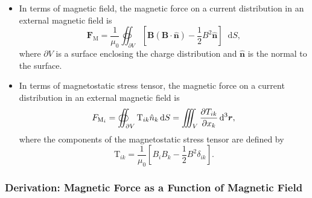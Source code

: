 \documentclass[11pt, a4paper]{article}
\newcommand{\diff}{\mathop{}\!\mathrm{d}} %
\newcommand{\dr}{\diff^{3} \r}  %
\renewcommand{\vec}[1]{\bm{#1}} %
\newcommand{\uvec}[1]{\hat{\vec{#1}}} %
\renewcommand{\r}{\vec{r}}
\newcommand{\B}{\vec{B}} %
\newcommand{\TT}{\mathrm{T}}  %
\newcommand{\mm}{\mu_{0}}  %
\begin{document}
\begin{itemize}
    \item In terms of magnetic field, the magnetic force on a current distribution in an external magnetic field is
    \begin{equation*}
        \vec{F}_{\text{M}} = \frac{1}{\mm} \oiint_{\partial V} \left[ \B (\B \cdot \uvec{n}) - \frac{1}{2}B^{2} \uvec{n} \right] \diff S,
    \end{equation*}
    where $ \partial V $ is a surface enclosing the charge distribution and $ \uvec{n} $ is the normal to the surface.

    \item In terms of magnetostatic stress tensor, the magnetic force on a current distribution in an external magnetic field is
    \begin{equation*}
        F_{\text{M}_{i}} = \oiint_{\partial V} \TT_{ik} \hat{n}_{k}\diff S = \iiint_{V} \pdv{T_{ik}}{x_{k}} \dr,
    \end{equation*}
    where the components of the magnetostatic stress tensor are defined by
    \begin{equation*}
        \TT_{ik} = \frac{1}{\mm} \left[ B_{i}B_{k} - \frac{1}{2}B^{2} \delta_{ik} \right].
    \end{equation*}
    
\end{itemize}

\subsubsection{Derivation: Magnetic Force as a Function of Magnetic Field}
\end{document}
